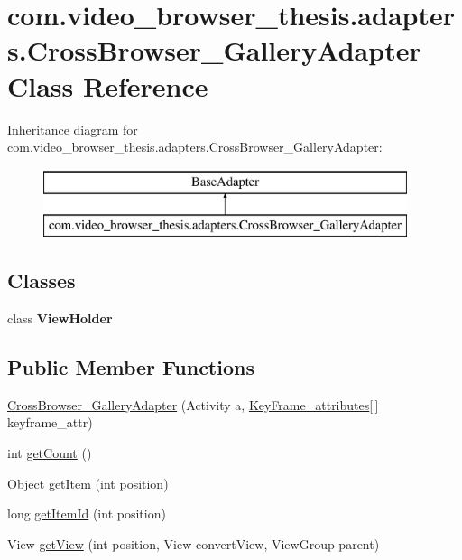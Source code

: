 \hypertarget{classcom_1_1video__browser__thesis_1_1adapters_1_1_cross_browser___gallery_adapter}{\section{com.\-video\-\_\-browser\-\_\-thesis.\-adapters.\-Cross\-Browser\-\_\-\-Gallery\-Adapter Class Reference}
\label{classcom_1_1video__browser__thesis_1_1adapters_1_1_cross_browser___gallery_adapter}
}
Inheritance diagram for com.\-video\-\_\-browser\-\_\-thesis.\-adapters.\-Cross\-Browser\-\_\-\-Gallery\-Adapter\-:\begin{figure}[H]
\begin{center}
\leavevmode
\includegraphics[height=2.000000cm]{classcom_1_1video__browser__thesis_1_1adapters_1_1_cross_browser___gallery_adapter}
\end{center}
\end{figure}
\subsection*{Classes}
\begin{DoxyCompactItemize}
\item 
class {\bfseries View\-Holder}
\end{DoxyCompactItemize}
\subsection*{Public Member Functions}
\begin{DoxyCompactItemize}
\item 
\hyperlink{classcom_1_1video__browser__thesis_1_1adapters_1_1_cross_browser___gallery_adapter_a5bec14c676feea6e65dd79a4ce22d7d6}{Cross\-Browser\-\_\-\-Gallery\-Adapter} (Activity a, \hyperlink{classcom_1_1video__browser__thesis_1_1elements_1_1_key_frame__attributes}{Key\-Frame\-\_\-attributes}\mbox{[}$\,$\mbox{]} keyframe\-\_\-attr)
\item 
int \hyperlink{classcom_1_1video__browser__thesis_1_1adapters_1_1_cross_browser___gallery_adapter_a0bc2bad4158721a2c980333660500293}{get\-Count} ()
\item 
Object \hyperlink{classcom_1_1video__browser__thesis_1_1adapters_1_1_cross_browser___gallery_adapter_a0338a3aa8ea67422d04cd093a590079a}{get\-Item} (int position)
\item 
long \hyperlink{classcom_1_1video__browser__thesis_1_1adapters_1_1_cross_browser___gallery_adapter_ac794563aeebce4fbb9e1e6bd4dc36300}{get\-Item\-Id} (int position)
\item 
View \hyperlink{classcom_1_1video__browser__thesis_1_1adapters_1_1_cross_browser___gallery_adapter_a8423f77586d7eccc4bad253afa7be195}{get\-View} (int position, View convert\-View, View\-Group parent)
\end{DoxyCompactItemize}


